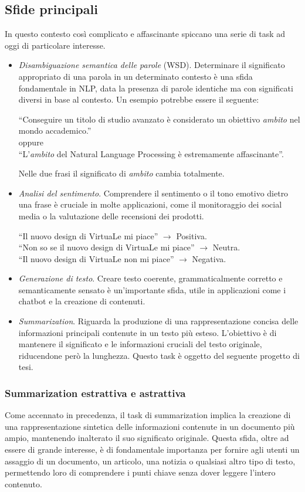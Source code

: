 \documentclass[12pt,a4paper,twoside,openright]{book}
\begin{document}
\subsection{Sfide principali}
In questo contesto così complicato e affascinante spiccano una serie di task ad oggi di particolare interesse. 
\begin{itemize}
    \item \emph{Disambiguazione semantica delle parole} (WSD). Determinare il significato appropriato di una parola in un determinato contesto è una sfida fondamentale in NLP, data la presenza di parole identiche ma con significati diversi in base al contesto.
    Un esempio potrebbe essere il seguente:
    \begin{center}
        ``Conseguire un titolo di studio avanzato è considerato un obiettivo \emph{ambito} nel mondo accademico.'' \\
        oppure \\
        ``L'\emph{ambito} del Natural Language Processing è estremamente affascinante''.
    \end{center}
    Nelle due frasi il significato di \emph{ambito} cambia totalmente.
    \item \emph{Analisi del sentimento}. Comprendere il sentimento o il tono emotivo dietro una frase è cruciale in molte applicazioni, come il monitoraggio dei social media o la valutazione delle recensioni dei prodotti. 
    \begin{center}
        ``Il nuovo design di VirtuaLe mi piace'' $\rightarrow$ Positiva. \\
        ``Non so se il nuovo design di VirtuaLe mi piace'' $\rightarrow$ Neutra. \\
        ``Il nuovo design di VirtuaLe non mi piace'' $\rightarrow$ Negativa. 
    \end{center}
    \item \emph{Generazione di testo}. Creare testo coerente, grammaticalmente corretto e semanticamente sensato è un'importante sfida, utile in applicazioni come i chatbot e la creazione di contenuti.
    \item \emph{Summarization}. Riguarda la produzione di una rappresentazione concisa delle informazioni principali contenute in un testo più esteso. L'obiettivo è di mantenere il significato e le informazioni cruciali del testo originale, riducendone però la lunghezza. Questo task è oggetto del seguente progetto di tesi.
\end{itemize}

\subsubsection{Summarization estrattiva e astrattiva}
Come accennato in precedenza, il task di summarization implica la creazione di una rappresentazione sintetica delle informazioni contenute in un documento più ampio, mantenendo inalterato il suo significato originale. Questa sfida, oltre ad essere di grande interesse, è di fondamentale importanza per fornire agli utenti un assaggio di un documento, un articolo, una notizia o qualsiasi altro tipo di testo, permettendo loro di comprendere i punti chiave senza dover leggere l'intero contenuto.
\end{document}
